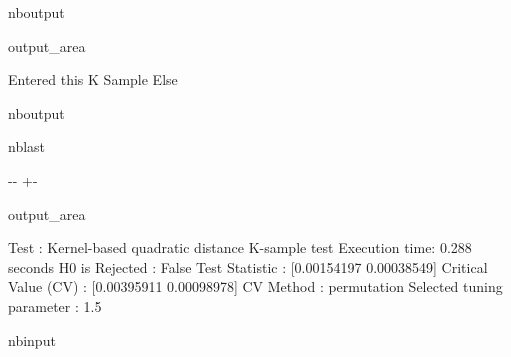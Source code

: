 \documentclass[letterpaper,10pt,english,openany,oneside]{sphinxmanual}
\begin{document}
{{{{\begin{sphinxuseclass}{nboutput}
{
\begin{sphinxuseclass}{output_area}
\begin{sphinxuseclass}{}


\begin{sphinxVerbatim}[commandchars=\\\{\}]
Entered this K Sample Else
\end{sphinxVerbatim}



\end{sphinxuseclass}
\end{sphinxuseclass}
}

\end{sphinxuseclass}
\begin{sphinxuseclass}{nboutput}
\begin{sphinxuseclass}{nblast}
{

\kern-\sphinxverbatimsmallskipamount\kern-\baselineskip
\kern+\FrameHeightAdjust\kern-\fboxrule
\vspace{\nbsphinxcodecellspacing}

\begin{sphinxuseclass}{output_area}
\begin{sphinxuseclass}{}


\begin{sphinxVerbatim}[commandchars=\\\{\}]
Test : Kernel-based quadratic distance K-sample test
Execution time: 0.288 seconds
H0 is Rejected : False
Test Statistic : [0.00154197 0.00038549]
Critical Value (CV) : [0.00395911 0.00098978]
CV Method : permutation
Selected tuning parameter : 1.5
\end{sphinxVerbatim}



\end{sphinxuseclass}
\end{sphinxuseclass}
}

\end{sphinxuseclass}
\end{sphinxuseclass}
\begin{sphinxuseclass}{nbinput}
{
\begin{sphinxVerbatim}[commandchars=\\\{\}]
\llap{\color{nbsphinxin}[10]:\,\hspace{\fboxrule}\hspace{\fboxsep}}
\end{sphinxVerbatim}
}


\end{sphinxuseclass}}}}}
\end{document}
